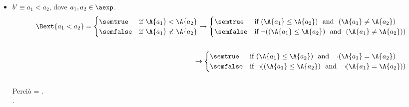 {\begin{enumerate}[label=(\alph*)]
\begin{itemize}
    \item $ b' \equiv a_1 < a_2$, dove $a_1, a_2 \in \aexp$. \\
      \begin{align*}
        \Bext{a_1 < a_2} = 
        \begin{cases} 
        \semtrue & 
        \mbox{if} \ \A{a_1} < \A{a_2}\\ 
        \semfalse & 
        \mbox{if} \ \A{a_1} \not < \A{a_2}\\
        \end{cases}
        \rightarrow
        \begin{cases} 
        \semtrue & 
        \mbox{if} \ (\A{a_1} \leq \A{a_2}) \ \mbox{ and } \ (\A{a_1} \not =  \A{a_2})\\ 
        \semfalse & 
        \mbox{if} \ \lnot ((\A{a_1} \leq \A{a_2}) \ \mbox{ and } \ (\A{a_1} \not =  \A{a_2}))\\
        \end{cases} \\ \\
        \rightarrow
        \begin{cases} 
        \semtrue & 
        \mbox{if} \ (\A{a_1} \leq \A{a_2}) \ \mbox{ and } \ \lnot (\A{a_1} =  \A{a_2})\\ 
        \semfalse & 
        \mbox{if} \ \lnot ((\A{a_1} \leq \A{a_2}) \ \mbox{ and } \ \lnot (\A{a_1} = \A{a_2}))\\
        \end{cases}
      \end{align*} \\
      Perciò  =
      . \\.


\end{itemize}
\end{enumerate}}
